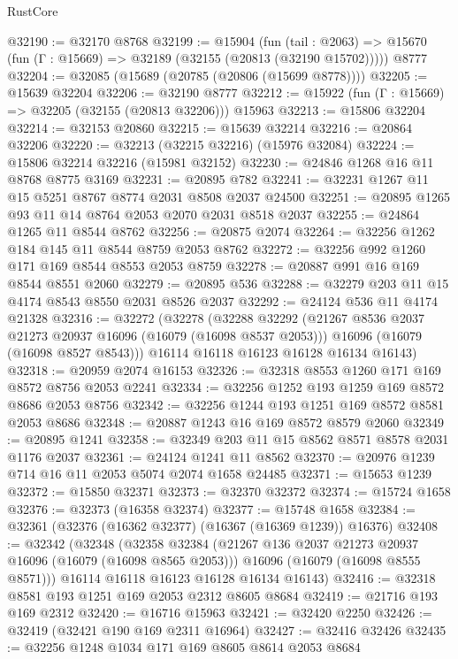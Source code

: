\begin{lexlean}{RustCore}
\begin{coremodule}
@32190 := @32170 @8768
@32199 := @15904
    (fun (tail : @2063) => @15670 (fun (Γ : @15669) => @32189 (@32155 (@20813 (@32190 @15702)))))
    @8777
@32204 := @32085 (@15689 (@20785 (@20806 (@15699 @8778))))
@32205 := @15639 @32204
@32206 := @32190 @8777
@32212 := @15922 (fun (Γ : @15669) => @32205 (@32155 (@20813 @32206))) @15963
@32213 := @15806 @32204
@32214 := @32153 @20860
@32215 := @15639 @32214
@32216 := @20864 @32206
@32220 := @32213 (@32215 @32216) (@15976 @32084)
@32224 := @15806 @32214 @32216 (@15981 @32152)
@32230 := @24846 @1268 @16 @11 @8768 @8775 @3169
@32231 := @20895 @782
@32241 := @32231 @1267 @11 @15 @5251 @8767 @8774 @2031 @8508 @2037 @24500
@32251 := @20895 @1265 @93 @11 @14 @8764 @2053 @2070 @2031 @8518 @2037
@32255 := @24864 @1265 @11 @8544 @8762
@32256 := @20875 @2074
@32264 := @32256 @1262 @184 @145 @11 @8544 @8759 @2053 @8762
@32272 := @32256 @992 @1260 @171 @169 @8544 @8553 @2053 @8759
@32278 := @20887 @991 @16 @169 @8544 @8551 @2060
@32279 := @20895 @536
@32288 := @32279 @203 @11 @15 @4174 @8543 @8550 @2031 @8526 @2037
@32292 := @24124 @536 @11 @4174 @21328
@32316 := @32272
    (@32278
      (@32288
        @32292
        (@21267 @8536 @2037 @21273 @20937 @16096 (@16079 (@16098 @8537 @2053)))
        @16096
        (@16079 (@16098 @8527 @8543)))
      @16114
      @16118
      @16123
      @16128
      @16134
      @16143)
@32318 := @20959 @2074 @16153
@32326 := @32318 @8553 @1260 @171 @169 @8572 @8756 @2053 @2241
@32334 := @32256 @1252 @193 @1259 @169 @8572 @8686 @2053 @8756
@32342 := @32256 @1244 @193 @1251 @169 @8572 @8581 @2053 @8686
@32348 := @20887 @1243 @16 @169 @8572 @8579 @2060
@32349 := @20895 @1241
@32358 := @32349 @203 @11 @15 @8562 @8571 @8578 @2031 @1176 @2037
@32361 := @24124 @1241 @11 @8562
@32370 := @20976 @1239 @714 @16 @11 @2053 @5074 @2074 @1658 @24485
@32371 := @15653 @1239
@32372 := @15850 @32371
@32373 := @32370 @32372
@32374 := @15724 @1658
@32376 := @32373 (@16358 @32374)
@32377 := @15748 @1658
@32384 := @32361 (@32376 (@16362 @32377) (@16367 (@16369 @1239)) @16376)
@32408 := @32342
    (@32348
      (@32358
        @32384
        (@21267 @136 @2037 @21273 @20937 @16096 (@16079 (@16098 @8565 @2053)))
        @16096
        (@16079 (@16098 @8555 @8571)))
      @16114
      @16118
      @16123
      @16128
      @16134
      @16143)
@32416 := @32318 @8581 @193 @1251 @169 @2053 @2312 @8605 @8684
@32419 := @21716 @193 @169 @2312
@32420 := @16716 @15963
@32421 := @32420 @2250
@32426 := @32419 (@32421 @190 @169 @2311 @16964)
@32427 := @32416 @32426
@32435 := @32256 @1248 @1034 @171 @169 @8605 @8614 @2053 @8684

\end{coremodule}
\end{lexlean}
